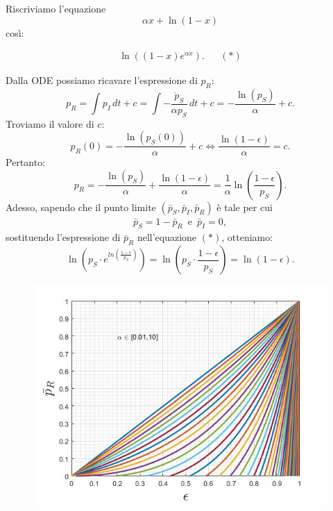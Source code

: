 \documentclass[11pt,largemargins]{homework}
\begin{document}
\begin {alphaparts}
\questionpart
Riscriviamo l'equazione 
\begin{equation*}
\alpha x + \ln{\left(1-x\right)}
\end{equation*}
 così:
 
 
 \begin{align*}
 \ln{\left(\left(1-x\right)e^{\alpha x}\right)}. && \left(*\right)
 \end{align*}
  
 Dalla ODE possiamo ricavare l'espressione di $p_{R}$:
  \begin{equation*}
  p_{R}=\int p_{I}\,dt + c = \int -\frac{\dot{p}_{S}}{\alpha p_{S}} \,dt + c= -\frac{\ln{\left(p_{S}\right)}}{\alpha} + c.
  \end{equation*}
  Troviamo il valore di $c$:
  \begin{equation*}
  p_{R}\left(0\right)=-\frac{\ln{\left(p_{S}\left(0\right)\right)}}{\alpha} + c\Leftrightarrow \frac{\ln{\left(1-\epsilon\right)}}{\alpha} = c.
  \end{equation*}
  Pertanto:
  \begin{equation*}
  p_{R}=-\frac{\ln{\left(p_{S}\right)}}{\alpha} + \frac{\ln{\left(1-\epsilon\right)}}{\alpha}=\frac{1}{\alpha}\ln{\left(\frac{1-\epsilon}{p_{S}}\right)}.
  \end{equation*}
  Adesso, sapendo che il punto limite $\left(\bar{p}_{S},\bar{p}_{I},\bar{p}_{R}\right)$ è tale per cui
  \begin{align*}
  \bar{p}_{S}=1-\bar{p}_{R} \,\,\, \text{e} \,\,\, \bar{p}_{I}=0,
  \end{align*}
  sostituendo l'espressione di $\bar{p}_{R}$ nell'equazione $\left(*\right)$, otteniamo:
  \begin{equation*}
  \ln{\left(p_{S}\cdot e^{ln{\left(\frac{1-\epsilon}{p_{S}}\right)}}\right)}=\ln{\left(p_{S}\cdot\frac{1-\epsilon}{p_{S}}\right)}=\ln{\left(1-\epsilon\right)}.
  \end{equation*}
  
  \begin{figure}[htb]\centering
\includegraphics[scale=0.70]{plotex1_d.jpg}
  \end{figure}
  

\end{alphaparts}
\end{document}
